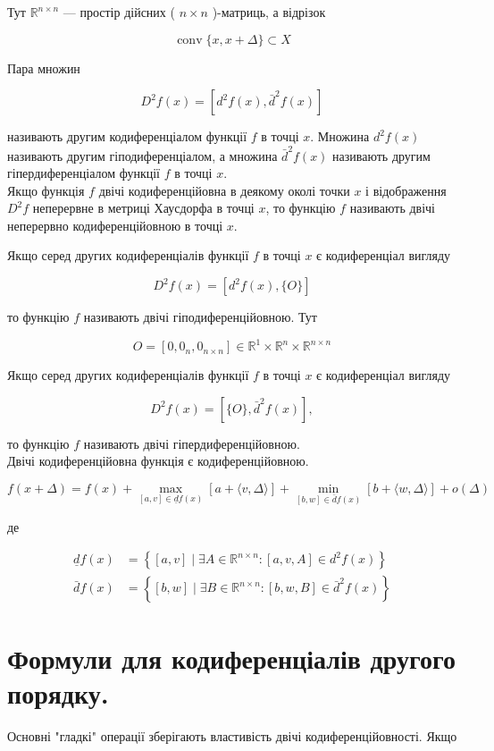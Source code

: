 \documentclass[12pt,a4paper]{extarticle}
\numberwithin{section}{part}
\begin{document}
Тут $\mathbb{R}^{n \times n}$ --- простір дійсних ( $n \times n$ )-матриць, а відрізок

$$
\operatorname{conv}\{x, x+\Delta\} \subset X
$$

Пара множин

$$
D^{2} f(x)=\left[d^{2} f(x), \bar{d}^{2} f(x)\right]
$$

називають другим кодиференціалом функції $f$ в точці $x$. Множина $d^{2} f(x)$ називають другим гіподиференціалом, а множина $\bar{d}^{2} f(x)$ називають другим гіпердиференціалом функції $f$ в точці $x$.\\
Якщо функція $f$ двічі кодиференційовна в деякому околі точки $x$ і відображення $D^{2} f$ неперервне в метриці Хаусдорфа в точці $x$, то функцію $f$ називають двічі неперервно кодиференційовною в точці $x$.

Якщо серед других кодиференціалів функції $f$ в точці $x$ є кодиференціал вигляду

$$
D^{2} f(x)=\left[d^{2} f(x),\{O\}\right]
$$

то функцію $f$ називають двічі гіподиференційовною. Тут

$$
O=\left[0,0_{n}, 0_{n \times n}\right] \in \mathbb{R}^{1} \times \mathbb{R}^{n} \times \mathbb{R}^{n \times n}
$$

Якщо серед других кодиференціалів функції $f$ в точці $x$ є кодиференціал вигляду

$$
D^{2} f(x)=\left[\{O\}, \bar{d}^{2} f(x)\right],
$$

то функцію $f$ називають двічі гіпердиференційовною.\\
Двічі кодиференційовна функція є кодиференційовною.

$$
f(x+\Delta)=f(x)+\max _{[a, v] \in \underline{d} f(x)}[a+\langle v, \Delta\rangle]+\min _{[b, w] \in \bar{d} f(x)}[b+\langle w, \Delta\rangle]+o(\Delta)
$$

де

$$
\begin{aligned}
\underline{d} f(x) & =\left\{[a, v] \mid \exists A \in \mathbb{R}^{n \times n}:[a, v, A] \in d^{2} f(x)\right\} \\
\bar{d} f(x) & =\left\{[b, w] \mid \exists B \in \mathbb{R}^{n \times n}:[b, w, B] \in \bar{d}^{2} f(x)\right\}
\end{aligned}
$$

\section{Формули для кодиференціалів другого порядку.}
Основні "гладкі" операції зберігають властивість двічі кодиференційовності. Якщо
\end{document}
